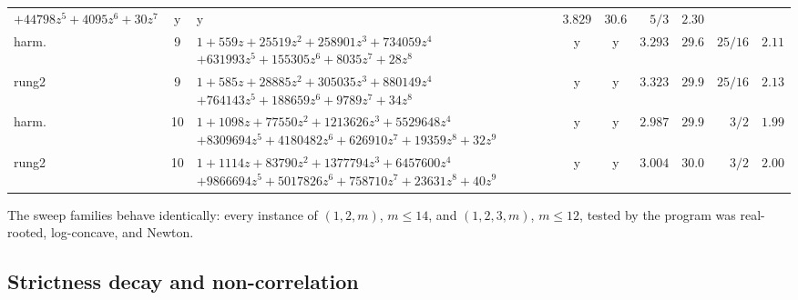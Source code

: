 \begin{table}[htbp]
\begin{tabularx}{\textwidth}{@{} l c >{\raggedright\arraybackslash}X c c r r r r @{}}
$+44798z^5+4095z^6+30z^7$ & y & y & $3.829$ & $30.6$ & $5/3$ & $2.30$ \\
harm. & 9 & $1+559z+25519z^2+258901z^3+734059z^4$\newline
$+631993z^5+155305z^6+8035z^7+28z^8$ & y & y & $3.293$ & $29.6$ & $25/16$ & $2.11$ \\
rung2 & 9 & $1+585z+28885z^2+305035z^3+880149z^4$\newline
$+764143z^5+188659z^6+9789z^7+34z^8$ & y & y & $3.323$ & $29.9$ & $25/16$ & $2.13$ \\
harm. & 10 & $1+1098z+77550z^2+1213626z^3+5529648z^4$\newline
$+8309694z^5+4180482z^6+626910z^7+19359z^8+32z^9$ & y & y & $2.987$
& $29.9$ & $3/2$ & $1.99$ \\
rung2 & 10 & $1+1114z+83790z^2+1377794z^3+6457600z^4$\newline
$+9866694z^5+5017826z^6+758710z^7+23631z^8+40z^9$ & y & y & $3.004$
& $30.0$ & $3/2$ & $2.00$ \\
\bottomrule
\end{tabularx}
\end{table}

The sweep families behave identically: every instance of $(1,2,m)$,
$m\le14$, and $(1,2,3,m)$, $m\le12$, tested by the program was
real-rooted, log-concave, and Newton.

\subsection{Strictness decay and non-correlation}

